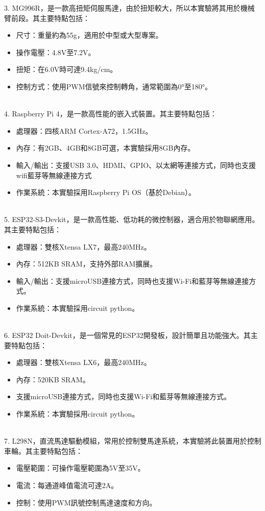 \documentclass[class=NCU_thesis, crop=false]{standalone}
\begin{document}
3. MG996R，是一款高扭矩伺服馬達，由於扭矩較大，所以本實驗將其用於機械臂前段。其主要特點包括：
\begin{itemize}
	\item 尺寸：重量約為55g，適用於中型或大型專案。
	\item 操作電壓：4.8V至7.2V。
	\item 扭矩：在6.0V時可達9.4kg/cm。
	\item 控制方式：使用PWM信號來控制轉角，通常範圍為0°至180°。
\end{itemize}\\

4. Raspberry Pi 4，是一款高性能的嵌入式裝置。其主要特點包括：
\begin{itemize}
	\item 處理器：四核ARM Cortex-A72，1.5GHz。
	\item 內存：有2GB、4GB和8GB可選，本實驗採用8GB內存。
	\item 輸入/輸出：支援USB 3.0、HDMI、GPIO、以太網等連接方式，同時也支援wifi藍芽等無線連接方式
	\item 作業系統：本實驗採用Raspberry Pi OS（基於Debian）。
\end{itemize}\\

5. ESP32-S3-Devkit，是一款高性能、低功耗的微控制器，適合用於物聯網應用。其主要特點包括：
\begin{itemize}
	\item 處理器：雙核Xtensa LX7，最高240MHz。
	\item 內存：512KB SRAM，支持外部RAM擴展。
	\item 輸入/輸出：支援microUSB連接方式，同時也支援Wi-Fi和藍芽等無線連接方式。
	\item 作業系統：本實驗採用circuit python。
\end{itemize}\\

6. ESP32 Doit-Devkit，是一個常見的ESP32開發板，設計簡單且功能強大。其主要特點包括：
\begin{itemize}
	\item 處理器：雙核Xtensa LX6，最高240MHz。
	\item 內存：520KB SRAM。
	\item 支援microUSB連接方式，同時也支援Wi-Fi和藍芽等無線連接方式。
	\item 作業系統：本實驗採用circuit python。
\end{itemize}\\

7. L298N，直流馬達驅動模組，常用於控制雙馬達系統，本實驗將此裝置用於控制車輪。其主要特點包括：
\begin{itemize}
	\item 電壓範圍：可操作電壓範圍為5V至35V。
	\item 電流：每通道峰值電流可達2A。
	\item 控制：使用PWM訊號控制馬達速度和方向。
\end{itemize}\\
\end{document}
